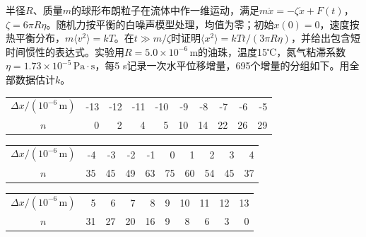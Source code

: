 \documentclass[UTF8,fontset=fandol,a4paper,11pt]{ctexart}
\begin{document}
半径$R$、质量$m$的球形布朗粒子在流体中作一维运动，满足$m\ddot x=-\zeta\dot x+F(t)$，$\zeta=6\pi R\eta$。随机力按平衡的白噪声模型处理，均值为零；初始$x(0)=0$，速度按热平衡分布，$m\langle v^2\rangle=kT$。在$t\gg m/\zeta$时证明$\langle x^2\rangle=kTt/(3\pi R\eta)$，并给出包含短时间惯性的表达式。实验用$R=5.0\times10^{-6}\,\mathrm m$的油珠，温度15℃，氮气粘滞系数$\eta=1.73\times10^{-5}\,\mathrm{Pa\cdot s}$，每5 s记录一次水平位移增量，695个增量的分组如下。用全部数据估计$k$。
\begin{center}\small\begin{tabular}{c|rrrrrrrrr}\toprule$\Delta x/(10^{-6}\,\mathrm m)$ & -13 & -12 & -11 & -10 & -9 & -8 & -7 & -6 & -5\\$n$ & 0 & 2 & 4 & 5 & 10 & 14 & 22 & 26 & 29\\\bottomrule\end{tabular}\end{center}
\begin{center}\small\begin{tabular}{c|rrrrrrrrr}\toprule$\Delta x/(10^{-6}\,\mathrm m)$ & -4 & -3 & -2 & -1 & 0 & 1 & 2 & 3 & 4\\$n$ & 35 & 45 & 49 & 63 & 75 & 60 & 54 & 45 & 37\\\bottomrule\end{tabular}\end{center}
\begin{center}\small\begin{tabular}{c|rrrrrrrrr}\toprule$\Delta x/(10^{-6}\,\mathrm m)$ & 5 & 6 & 7 & 8 & 9 & 10 & 11 & 12 & 13\\$n$ & 31 & 27 & 20 & 16 & 9 & 8 & 6 & 3 & 0\\\bottomrule\end{tabular}\end{center}
\end{document}
